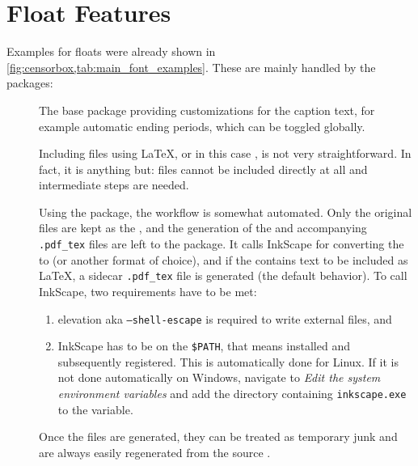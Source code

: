 \chapter{Float Features}

Examples for floats were already shown in \cref{fig:censorbox,tab:main_font_examples}.
These are mainly handled by the packages:
\begin{description}
    \item[]
          The base package providing customizations for the caption text, for example
          automatic ending periods, which can be toggled globally.
    \item[]
          Including  files using \LaTeX{}, or in this
          case , is not very straightforward.
          In fact, it is anything but:  files cannot
          be included directly at all and intermediate steps are needed.

          Using the  package, the workflow is somewhat automated.
          Only the original  files are kept as the
          , and the generation of the
           and accompanying \verb|.pdf_tex| files
          are left to the package.
          It calls InkScape for converting the  to
           (or another format of choice), and if the
           contains text to be included as \LaTeX{},
          a sidecar \verb|.pdf_tex| file is generated (the default behavior).
          To call InkScape, two requirements have to be met:
          \begin{enumerate}
              \item elevation aka \texttt{--shell-escape} is required to write
                    external files, and
              \item InkScape has to be on the \verb|$PATH|, that means installed and
                    subsequently registered.
                    This is automatically done for Linux.
                    If it is not done automatically on Windows, navigate to
                    \emph{Edit the system environment variables} and add the directory
                    containing \texttt{inkscape.exe} to the variable.
          \end{enumerate}
          Once the files are generated, they can be treated as temporary junk and are
          always easily regenerated from the source .


\end{description}
